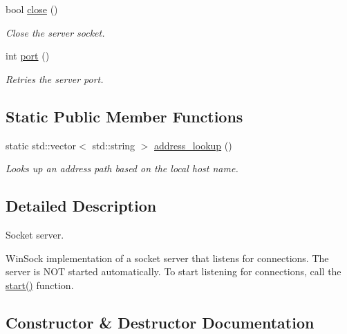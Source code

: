 \begin{DoxyCompactItemize}
bool \hyperlink{classcpen333_1_1process_1_1windows_1_1socket__server_a5eddf38d7b08e27f2299a750f16eae66}{close} ()
\begin{DoxyCompactList}\small\item\em Close the server socket. \end{DoxyCompactList}\item 
int \hyperlink{classcpen333_1_1process_1_1windows_1_1socket__server_a4b5f9231c046f947a77a6458202c2712}{port} ()
\begin{DoxyCompactList}\small\item\em Retries the server port. \end{DoxyCompactList}\end{DoxyCompactItemize}
\subsection*{Static Public Member Functions}
\begin{DoxyCompactItemize}
\item 
static std\+::vector$<$ std\+::string $>$ \hyperlink{classcpen333_1_1process_1_1windows_1_1socket__server_ad4f6bbc14fc0f8716feea2a120873b50}{address\+\_\+lookup} ()
\begin{DoxyCompactList}\small\item\em Looks up an address path based on the local host name. \end{DoxyCompactList}\end{DoxyCompactItemize}


\subsection{Detailed Description}
Socket server. 

Win\+Sock implementation of a socket server that listens for connections. The server is N\+OT started automatically. To start listening for connections, call the \hyperlink{classcpen333_1_1process_1_1windows_1_1socket__server_a0a2021766c8d5728d044a96d24bbc684}{start()} function. 

\subsection{Constructor \& Destructor Documentation}
\mbox{\label{classcpen333_1_1process_1_1windows_1_1socket__server_ada3d9f2a11e196dc91b3199b37fe50e2}} 

